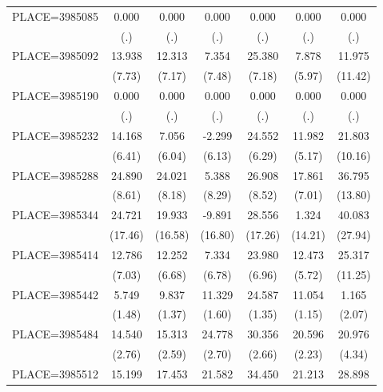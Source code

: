 {\begin{tabular}{l*{6}{c}}
PLACE=3985085       &       0.000&       0.000&       0.000&       0.000&       0.000&       0.000\\
                    &         (.)&         (.)&         (.)&         (.)&         (.)&         (.)\\
PLACE=3985092       &      13.938&      12.313&       7.354&      25.380&       7.878&      11.975\\
                    &      (7.73)&      (7.17)&      (7.48)&      (7.18)&      (5.97)&     (11.42)\\
PLACE=3985190       &       0.000&       0.000&       0.000&       0.000&       0.000&       0.000\\
                    &         (.)&         (.)&         (.)&         (.)&         (.)&         (.)\\
PLACE=3985232       &      14.168&       7.056&      -2.299&      24.552&      11.982&      21.803\\
                    &      (6.41)&      (6.04)&      (6.13)&      (6.29)&      (5.17)&     (10.16)\\
PLACE=3985288       &      24.890&      24.021&       5.388&      26.908&      17.861&      36.795\\
                    &      (8.61)&      (8.18)&      (8.29)&      (8.52)&      (7.01)&     (13.80)\\
PLACE=3985344       &      24.721&      19.933&      -9.891&      28.556&       1.324&      40.083\\
                    &     (17.46)&     (16.58)&     (16.80)&     (17.26)&     (14.21)&     (27.94)\\
PLACE=3985414       &      12.786&      12.252&       7.334&      23.980&      12.473&      25.317\\
                    &      (7.03)&      (6.68)&      (6.78)&      (6.96)&      (5.72)&     (11.25)\\
PLACE=3985442       &       5.749&       9.837&      11.329&      24.587&      11.054&       1.165\\
                    &      (1.48)&      (1.37)&      (1.60)&      (1.35)&      (1.15)&      (2.07)\\
PLACE=3985484       &      14.540&      15.313&      24.778&      30.356&      20.596&      20.976\\
                    &      (2.76)&      (2.59)&      (2.70)&      (2.66)&      (2.23)&      (4.34)\\
PLACE=3985512       &      15.199&      17.453&      21.582&      34.450&      21.213&      28.898\\

\end{tabular}}
